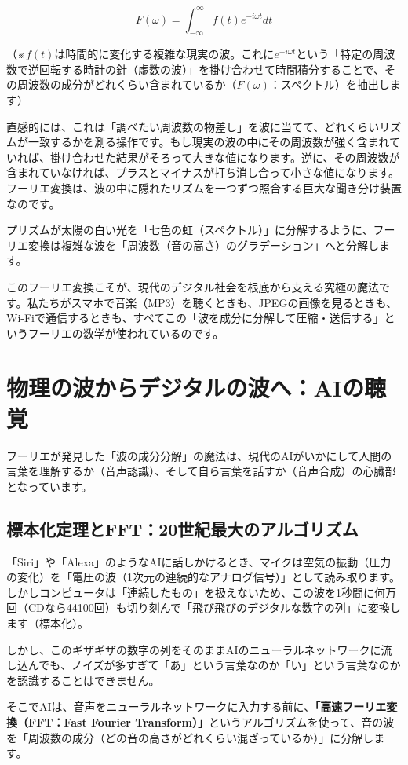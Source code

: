 \[F(\omega) = \int_{-\infty}^{\infty} f(t) e^{-i\omega t} dt\]

（※\(f(t)\)は時間的に変化する複雑な現実の波。これに\(e^{-i\omega t}\)という「特定の周波数で逆回転する時計の針（虚数の波）」を掛け合わせて時間積分することで、その周波数の成分がどれくらい含まれているか（\(F(\omega)\)：スペクトル）を抽出します）

直感的には、これは「調べたい周波数の物差し」を波に当てて、どれくらいリズムが一致するかを測る操作です。もし現実の波の中にその周波数が強く含まれていれば、掛け合わせた結果がそろって大きな値になります。逆に、その周波数が含まれていなければ、プラスとマイナスが打ち消し合って小さな値になります。フーリエ変換は、波の中に隠れたリズムを一つずつ照合する巨大な聞き分け装置なのです。

プリズムが太陽の白い光を「七色の虹（スペクトル）」に分解するように、フーリエ変換は複雑な波を「周波数（音の高さ）のグラデーション」へと分解します。

このフーリエ変換こそが、現代のデジタル社会を根底から支える究極の魔法です。私たちがスマホで音楽（MP3）を聴くときも、JPEGの画像を見るときも、Wi-Fiで通信するときも、すべてこの「波を成分に分解して圧縮・送信する」というフーリエの数学が使われているのです。

\section{物理の波からデジタルの波へ：AIの聴覚}

フーリエが発見した「波の成分分解」の魔法は、現代のAIがいかにして人間の言葉を理解するか（音声認識）、そして自ら言葉を話すか（音声合成）の心臓部となっています。

\subsection{標本化定理とFFT：20世紀最大のアルゴリズム}

「Siri」や「Alexa」のようなAIに話しかけるとき、マイクは空気の振動（圧力の変化）を「電圧の波（1次元の連続的なアナログ信号）」として読み取ります。しかしコンピュータは「連続したもの」を扱えないため、この波を1秒間に何万回（CDなら44100回）も切り刻んで「飛び飛びのデジタルな数字の列」に変換します（標本化）。

しかし、このギザギザの数字の列をそのままAIのニューラルネットワークに流し込んでも、ノイズが多すぎて「あ」という言葉なのか「い」という言葉なのかを認識することはできません。

そこでAIは、音声をニューラルネットワークに入力する前に、\textbf{「高速フーリエ変換（FFT：Fast Fourier Transform）」}というアルゴリズムを使って、音の波を「周波数の成分（どの音の高さがどれくらい混ざっているか）」に分解します。

